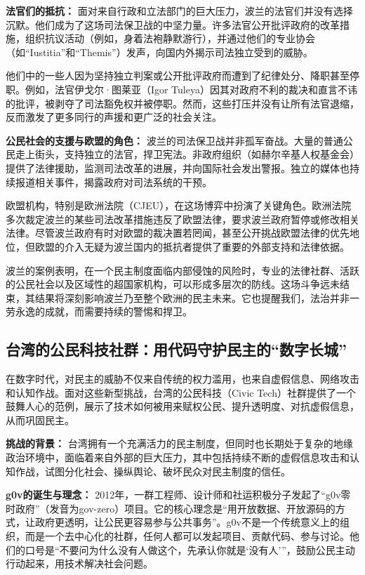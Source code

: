 \documentclass[UTF8, 10pt]{ctexbook}
\begin{document}
\textbf{法官们的抵抗：} 面对来自行政和立法部门的巨大压力，波兰的法官们并没有选择沉默。他们成为了这场司法保卫战的中坚力量。许多法官公开批评政府的改革措施，组织抗议活动（例如，身着法袍静默游行），并通过他们的专业协会（如“Iustitia”和“Themis”）发声，向国内外揭示司法独立受到的威胁。

他们中的一些人因为坚持独立判案或公开批评政府而遭到了纪律处分、降职甚至停职。例如，法官伊戈尔·图莱亚（Igor Tuleya）因其对政府不利的裁决和直言不讳的批评，被剥夺了司法豁免权并被停职。然而，这些打压并没有让所有法官退缩，反而激发了更多同行的声援和更广泛的社会关注。

\textbf{公民社会的支援与欧盟的角色：} 波兰的司法保卫战并非孤军奋战。大量的普通公民走上街头，支持独立的法官，捍卫宪法。非政府组织（如赫尔辛基人权基金会）提供了法律援助，监测司法改革的进展，并向国际社会发出警报。独立的媒体也持续报道相关事件，揭露政府对司法系统的干预。

欧盟机构，特别是欧洲法院（CJEU），在这场博弈中扮演了关键角色。欧洲法院多次裁定波兰的某些司法改革措施违反了欧盟法律，要求波兰政府暂停或修改相关法律。尽管波兰政府有时对欧盟的裁决置若罔闻，甚至公开挑战欧盟法律的优先地位，但欧盟的介入无疑为波兰国内的抵抗者提供了重要的外部支持和法律依据。

波兰的案例表明，在一个民主制度面临内部侵蚀的风险时，专业的法律社群、活跃的公民社会以及区域性的超国家机构，可以形成多层次的防线。这场斗争远未结束，其结果将深刻影响波兰乃至整个欧洲的民主未来。它也提醒我们，法治并非一劳永逸的成就，而需要持续的警惕和捍卫。

\subsection{台湾的公民科技社群：用代码守护民主的“数字长城”}
在数字时代，对民主的威胁不仅来自传统的权力滥用，也来自虚假信息、网络攻击和认知作战。面对这些新型挑战，台湾的公民科技（Civic Tech）社群提供了一个鼓舞人心的范例，展示了技术如何被用来赋权公民、提升透明度、对抗虚假信息，从而巩固民主。

\textbf{挑战的背景：} 台湾拥有一个充满活力的民主制度，但同时也长期处于复杂的地缘政治环境中，面临着来自外部的巨大压力，其中包括持续不断的虚假信息攻击和认知作战，试图分化社会、操纵舆论、破坏民众对民主制度的信任。

\textbf{g0v的诞生与理念：} 2012年，一群工程师、设计师和社运积极分子发起了“g0v零时政府”（发音为gov-zero）项目。它的核心理念是“用开放数据、开放源码的方式，让政府更透明，让公民更容易参与公共事务”。g0v不是一个传统意义上的组织，而是一个去中心化的社群，任何人都可以发起项目、贡献代码、参与讨论。他们的口号是“不要问为什么没有人做这个，先承认你就是‘没有人’”，鼓励公民主动行动起来，用技术解决社会问题。
\end{document}
